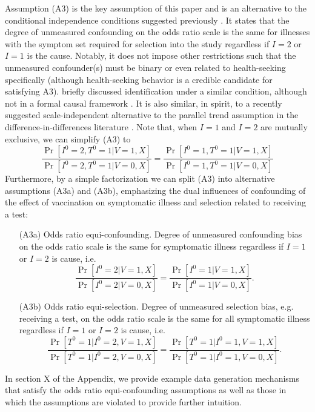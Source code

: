 \documentclass[11pt]{article}
\begin{document}
Assumption (A3) is the key assumption of this paper and is an alternative to the conditional independence conditions suggested previously \cite{schnitzer_estimands_2022}. It states that the degree of unmeasured confounding on the odds ratio scale is the same for illnesses with the symptom set required for selection into the study regardless if $I=2$ or $I=1$ is the cause. Notably, it does not impose other restrictions such that the unmeasured confounder(s) must be binary or even related to health-seeking specifically (although health-seeking behavior is a credible candidate for satisfying A3). \citeauthor{lewnard_measurement_2018} briefly discussed identification under a similar condition, although not in a formal causal framework \cite{lewnard_measurement_2018}. It is also similar, in spirit, to a recently suggested  scale-independent alternative to the parallel trend assumption in the difference-in-differences literature \cite{park_universal_2023,tchetgen_universal_2023}. Note that, when $I = 1$ and $I = 2$ are mutually exclusive, we can simplify (A3) to
\begin{equation}
    \frac{\Pr[I^0 = 2, T^0 = 1 | V = 1, X]}{\Pr[I^0 = 2, T^0 = 1 | V = 0, X]} =\frac{\Pr[I^0 = 1, T^0 = 1 | V = 1, X]}{\Pr[I^0 = 1, T^0 = 1 | V = 0, X]}
\end{equation}
Furthermore, by a simple factorization we can split (A3) into alternative assumptions (A3a) and (A3b), emphasizing the dual influences of confounding of the effect of vaccination on symptomatic illness and selection related to receiving a test:
\begin{itemize}
    \item[(A3a)] Odds ratio equi-confounding. Degree of unmeasured confounding bias on the odds ratio scale is the same for symptomatic illness regardless if $I=1$ or $I=2$ is cause, i.e. 
    $$\frac{\Pr[I^0 = 2 | V = 1, X]}{\Pr[I^0 = 2 | V = 0, X]} =\frac{\Pr[I^0 = 1 | V = 1, X]}{\Pr[I^0 = 1 | V = 0, X]}.$$
    \item[(A3b)] Odds ratio equi-selection. Degree of unmeasured selection bias, e.g. receiving a test, on the odds ratio scale is the same for all symptomatic illness regardless if $I=1$ or $I=2$ is cause, i.e. 
    $$\frac{\Pr[T^0 = 1 | I^0 = 2, V = 1, X]}{\Pr[T^0 = 1 | I^0 = 2, V = 0, X]} =\frac{\Pr[T^0 = 1 | I^0 = 1, V = 1, X]}{\Pr[T^0 = 1 | I^0 = 1, V = 0, X]}.$$
\end{itemize}
In section X of the Appendix, we provide example data generation mechanisms that satisfy the odds ratio equi-confounding assumptions as well as those in which the assumptions are violated to provide further intuition.
\end{document}
